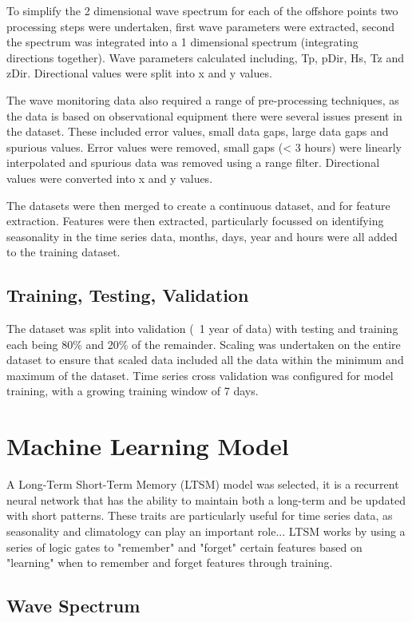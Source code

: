 \documentclass[a4paper,fleqn]{cas-sc}
\begin{document}
To simplify the 2 dimensional wave spectrum for each of the offshore points two processing steps were undertaken, first wave parameters were extracted, second the spectrum was integrated into a 1 dimensional spectrum (integrating directions together). Wave parameters calculated including, Tp, pDir, Hs, Tz and zDir. Directional values were split into x and y values.

The wave monitoring data also required a range of pre-processing techniques, as the data is based on observational equipment there were several issues present in the dataset. These included error values, small data gaps, large data gaps and spurious values. Error values were removed, small gaps (< 3 hours) were linearly interpolated and spurious data was removed using a range filter. Directional values were converted into x and y values. 

The datasets were then merged to create a continuous dataset, and for feature extraction. Features were then extracted, particularly focussed on identifying seasonality in the time series data, months, days, year and hours were all added to the training dataset. 

\subsection{Training, Testing, Validation}
The dataset was split into validation (~1 year of data) with testing and training each being 80\% and 20\% of the remainder. Scaling was undertaken on the entire dataset to ensure that scaled data included all the data within the minimum and maximum of the dataset. 
Time series cross validation was configured for model training, with a growing training window of 7 days.

\section{Machine Learning Model}
A Long-Term Short-Term Memory (LTSM) model was selected, it is a recurrent neural network that has the ability to maintain both a long-term  and be updated with short patterns. These traits are particularly useful for time series data, as seasonality and climatology can play an important role...
LTSM works by using a series of logic gates to "remember" and "forget" certain features based on "learning" when to remember and forget features through training.

\subsection{Wave Spectrum}\label{introspec}
\end{document}
